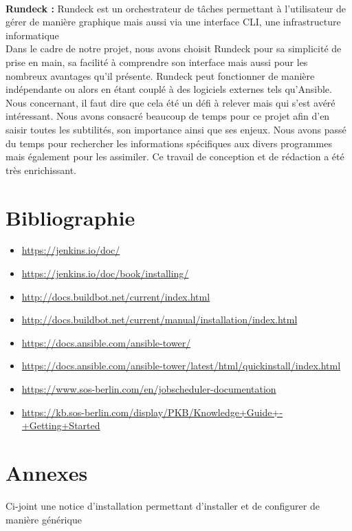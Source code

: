 \documentclass[12pt]{article}
\begin{document}
\\
\textbf{Rundeck :} Rundeck est un orchestrateur de tâches permettant à l'utilisateur de gérer de manière graphique mais aussi via une interface CLI, une infrastructure informatique
\vspace{0.5cm}
\\
Dans le cadre de notre projet, nous avons choisit Rundeck pour sa simplicité de prise en main, sa facilité à comprendre son interface mais aussi pour les nombreux avantages qu'il présente. Rundeck peut fonctionner de manière indépendante ou alors en étant couplé à des logiciels externes tels qu'Ansible.
\\
\vspace{1cm}
Nous concernant, il faut dire que cela été un défi à relever mais qui s'est avéré intéressant. Nous avons consacré beaucoup de temps pour ce projet afin d'en saisir toutes les subtilités, son importance ainsi que ses enjeux. Nous avons passé du temps pour rechercher les informations spécifiques aux divers programmes mais également pour les assimiler. Ce travail de conception et de rédaction a été très enrichissant.  
 
\newpage
\section{Bibliographie}

\begin{itemize}
    \item \url{https://jenkins.io/doc/}
    \item \url{https://jenkins.io/doc/book/installing/}
    \item \url{http://docs.buildbot.net/current/index.html}
    \item \url{http://docs.buildbot.net/current/manual/installation/index.html}
    \item \url{https://docs.ansible.com/ansible-tower/}
    \item \url{https://docs.ansible.com/ansible-tower/latest/html/quickinstall/index.html}
    \item \url{https://www.sos-berlin.com/en/jobscheduler-documentation}
    \item \url{https://kb.sos-berlin.com/display/PKB/Knowledge+Guide+-+Getting+Started}
\end{itemize}

\newpage
\section{Annexes}
Ci-joint une notice d'installation permettant d'installer et de configurer de manière générique
\end{document}

